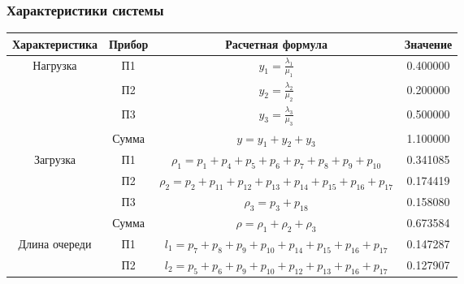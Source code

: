 \subsubsection{Характеристики системы}
\begin{adjustbox}{max width=\textwidth}
\begin{tabular}{|c|c|c|c|}
\hline
Характеристика                      & Прибор & Расчетная формула                                                                                             & Значение  \\ \hline
\multirow{4}{*}{Нагрузка}           & П1     & $y_1 = \frac{\lambda_1}{\mu_1}$                                                                               & 0.400000  \\ \cline{2-4}
                                    & П2     & $y_2 = \frac{\lambda_2}{\mu_2}$                                                                               & 0.200000  \\ \cline{2-4}
                                    & П3     & $y_3 = \frac{\lambda_3}{\mu_3}$                                                                               & 0.500000  \\ \cline{2-4}
                                    & Сумма  & $y = y_1+y_2+y_3$                                                                                             & 1.100000  \\ \hline
\multirow{4}{*}{Загрузка}           & П1     & $\rho_1 = p_1+p_4+p_5+p_6+p_7+p_8+p_9+p_{10}$                                                                 & 0.341085  \\ \cline{2-4}
                                    & П2     & $\rho_2 = p_2+p_{11}+p_{12}+p_{13}+p_{14}+p_{15}+p_{16}+p_{17}$                                               & 0.174419  \\ \cline{2-4}
                                    & П3     & $\rho_3 = p_3+p_{18}$                                                                                         & 0.158080  \\ \cline{2-4}
                                    & Сумма  & $\rho = \rho_1+\rho_2+\rho_3$                                                                                 & 0.673584  \\ \hline
\multirow{4}{*}{Длина очереди}      & П1     & $l_1 = p_7+p_8+p_9+p_{10}+p_{14}+p_{15}+p_{16}+p_{17}$                                                        & 0.147287  \\ \cline{2-4}
                                    & П2     & $l_2 = p_5+p_6+p_9+p_{10}+p_{12}+p_{13}+p_{16}+p_{17}$                                                        & 0.127907  \\ \cline{2-4}

\end{tabular}
\end{adjustbox}
